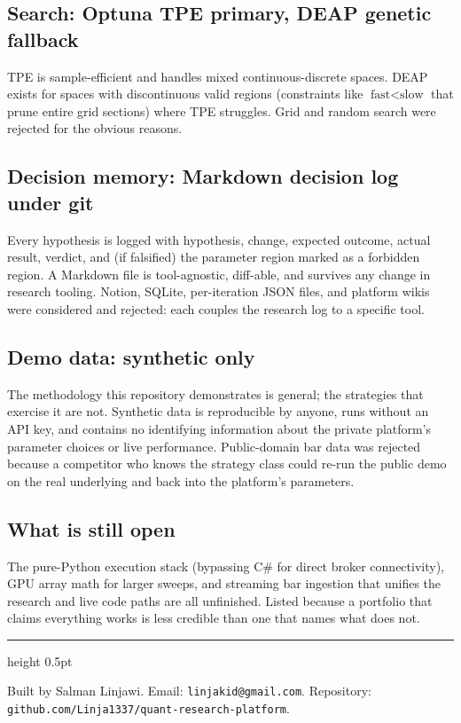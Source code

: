 \documentclass[10pt,letterpaper]{article}
\begin{document}
\subsection{Search: Optuna TPE primary, DEAP genetic fallback}

TPE is sample-efficient and handles mixed continuous-discrete spaces. DEAP exists for spaces with discontinuous valid regions (constraints like $\text{fast} < \text{slow}$ that prune entire grid sections) where TPE struggles. Grid and random search were rejected for the obvious reasons.

\subsection{Decision memory: Markdown decision log under git}

Every hypothesis is logged with hypothesis, change, expected outcome, actual result, verdict, and (if falsified) the parameter region marked as a forbidden region. A Markdown file is tool-agnostic, diff-able, and survives any change in research tooling. Notion, SQLite, per-iteration JSON files, and platform wikis were considered and rejected: each couples the research log to a specific tool.

\subsection{Demo data: synthetic only}

The methodology this repository demonstrates is general; the strategies that exercise it are not. Synthetic data is reproducible by anyone, runs without an API key, and contains no identifying information about the private platform's parameter choices or live performance. Public-domain bar data was rejected because a competitor who knows the strategy class could re-run the public demo on the real underlying and back into the platform's parameters.

\subsection{What is still open}

The pure-Python execution stack (bypassing C\# for direct broker connectivity), GPU array math for larger sweeps, and streaming bar ingestion that unifies the research and live code paths are all unfinished. Listed because a portfolio that claims everything works is less credible than one that names what does not.

\vspace{1em}
{\color{rule}\hrule height 0.5pt}
\vspace{0.4em}

\noindent\small\sffamily Built by Salman Linjawi. Email: \texttt{linjakid@gmail.com}. Repository: \texttt{github.com/Linja1337/quant-research-platform}.
\end{document}
